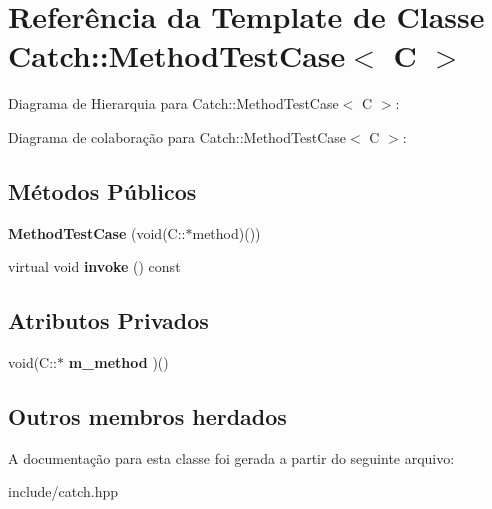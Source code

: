 \hypertarget{classCatch_1_1MethodTestCase}{}\section{Referência da Template de Classe Catch\+:\+:Method\+Test\+Case$<$ C $>$}
\label{classCatch_1_1MethodTestCase}


Diagrama de Hierarquia para Catch\+:\+:Method\+Test\+Case$<$ C $>$\+:


Diagrama de colaboração para Catch\+:\+:Method\+Test\+Case$<$ C $>$\+:
\subsection*{Métodos Públicos}
\begin{DoxyCompactItemize}
\item 
{\bfseries Method\+Test\+Case} (void(C\+::$\ast$method)())\hypertarget{classCatch_1_1MethodTestCase_a7b043b85dae371358255dd9dc6582e7b}{}\label{classCatch_1_1MethodTestCase_a7b043b85dae371358255dd9dc6582e7b}

\item 
virtual void {\bfseries invoke} () const \hypertarget{classCatch_1_1MethodTestCase_a39cc4b760dd71adc3f7550bc1e7eb697}{}\label{classCatch_1_1MethodTestCase_a39cc4b760dd71adc3f7550bc1e7eb697}

\end{DoxyCompactItemize}
\subsection*{Atributos Privados}
\begin{DoxyCompactItemize}
\item 
void(C\+::$\ast$ {\bfseries m\+\_\+method} )()\hypertarget{classCatch_1_1MethodTestCase_a47f7e18517ff108890603f05b15b57d8}{}\label{classCatch_1_1MethodTestCase_a47f7e18517ff108890603f05b15b57d8}

\end{DoxyCompactItemize}
\subsection*{Outros membros herdados}


A documentação para esta classe foi gerada a partir do seguinte arquivo\+:\begin{DoxyCompactItemize}
\item 
include/catch.\+hpp\end{DoxyCompactItemize}
